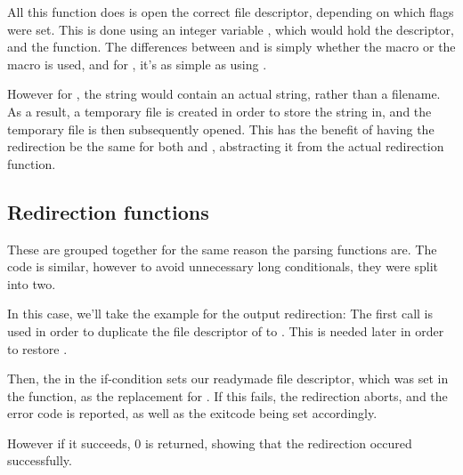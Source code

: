 \documentclass[12pt, a4paper]{report}
\begin{document}
                All this function does is open the correct file descriptor,
                depending on which flags were set. This is done using an
                integer variable , which would hold the descriptor,
                and the  function. The differences between \tx{>}
                and \tx{>>>} is simply whether the  macro or the 
                 macro is used, and for \tx{<}, it's as simple as
                using .

                However for \tx{<<<}, the  string would contain an 
                actual string, rather than a filename. As a result, a temporary
                file  is created in order to store the string in,
                and the temporary file is then subsequently opened. This has the
                benefit of having the redirection be the same for both \tx{<<<}
                and \tx{<}, abstracting it from the actual redirection function.
                \clearpage
            \subsection{Redirection functions}
                These are grouped together for the same reason the parsing
                functions are. The code is similar, however to avoid 
                unnecessary long conditionals, they were split into two.

                In this case, we'll take the example for the output redirection:
                \begingroup
                    \fontsize{10pt}{10pt}\selectfont
                \endgroup
                The first  call is used in order to duplicate the file
                descriptor of  to . This is needed later
                in order to restore .

                Then, the  in the if-condition sets our readymade 
                file descriptor, which was set in the  function,
                as the replacement for . If this fails, the redirection
                aborts, and the error code is reported, as well as the exitcode 
                being set accordingly.

                However if it succeeds, 0 is returned, showing that the redirection
                occured successfully. 
\end{document}
